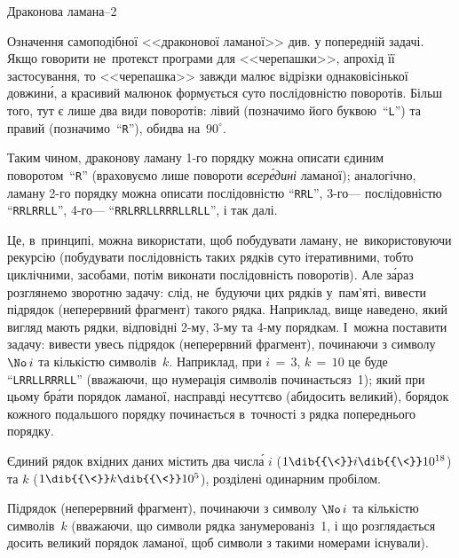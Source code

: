 \begin{problemAllDefault}{Драконова ламана--2}

Означення самоподібної <<драконової ламаної>> див. у попередній задачі.
Якщо говорити не~про\nolinebreak[2] текст програми для <<черепашки>>, а\nolinebreak[3] про\nolinebreak[2] хід її застосування, то 
<<черепашка>> завжди малює відрізки однаковісінької довжин\'{и}, а красивий малюнок формується суто послідовністю поворотів. Більш того, тут є лише два види поворотів:  
лівий (позначимо його буквою~``\texttt{L}'') та
правий (позначимо~``\texttt{R}''), обидва на~$90^\circ$.

{%
Таким чином, драконову ламану \mbox{1-го} порядку можна описати єдиним поворотом~``\texttt{\small{R}}'' (враховуємо лише повороти \emph{всер\'{е}дині} ламаної); аналогічно, ламану \mbox{2-го} порядку можна описати послідовністю  
``\texttt{\small{RRL}}'', \mbox{3-го}\nolinebreak[3] --- послідовністю 
``\texttt{\small{RRLRRLL}}'', \mbox{4-го}\nolinebreak[3] --- 
``\texttt{\small{RRLRRLLRRRLLRLL}}'', і так далі.

}

Це, в~принципі, можна використати, щоб побудувати ламану, не~використовуючи рекурсію (побудувати послідовність таких рядків суто ітеративними, тобто циклічними, засобами, потім виконати послідовність поворотів). Але з\'{а}раз розглянемо зворотню задачу: слід, не~будуючи цих рядків у~пам'яті, вивести підря\-док (неперервний фрагмент) такого рядка. Наприклад, вище наведено, який вигляд мають рядки, відповідні \mbox{2-му}, \mbox{3-му} та \mbox{4-му} порядкам.
І~можна поставити задачу: вивести увесь підря\-док (неперервний фрагмент), починаючи з символу $\No\,i$ та кількістю символів~$k$. Наприклад, при ${i\,{=}\,3}$, ${k\,{=}\,10}$ це буде ``\texttt{\small{LRRLLRRRLL}}'' (вважаючи, що нумерація символів починається\nolinebreak[3] з~1); який при цьому бр\'{а}ти порядок ламаної, насправді несуттєво (аби\nolinebreak[2] досить великий), бо\nolinebreak[2] рядок кожного подальшого поряд\-ку починається в~точності з рядка попереднього \mbox{порядку}.

\InputFile
Єдиний рядок вхідних даних містить два числ\'{а} $i$ ($1\dib{{\<}}i\dib{{\<}}10^{18}$) та $k$ ($1\dib{{\<}}k\dib{{\<}}10^{5}$), розділені одинарним пробілом.

\OutputFile
Підрядок (неперервний фрагмент), починаючи з символу $\No\,i$ та кількістю символів~$k$
(вважаючи, що символи рядка занумеровані\nolinebreak[3] з~1, і що розглядається досить великий порядок ламаної, щоб символи з такими номерами існували).

\end{problemAllDefault}

